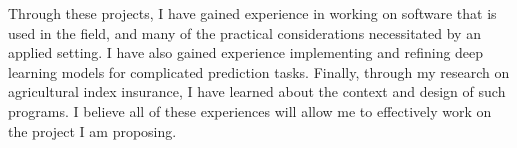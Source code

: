 \documentclass[12pt]{article}
\begin{document}
Through these projects, I have gained experience in working on software that is used in the field, and many of the practical considerations  necessitated by an applied setting. I have also gained experience implementing and refining deep learning models for complicated prediction tasks. Finally, through my research on agricultural index insurance, I have learned about the context and design of such programs. I believe all of these experiences will allow me to effectively work on the project I am proposing. 
 
\end{document}
